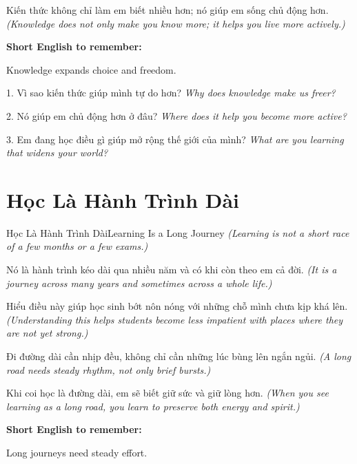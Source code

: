 \begin{baihoc}
Kiến thức không chỉ làm em biết nhiều hơn; nó giúp em sống chủ động hơn.
\textit{(Knowledge does not only make you know more; it helps you live more actively.)}
\end{baihoc}

\begin{ghinhoanh}
\textbf{Short English to remember:}

Knowledge expands choice and freedom.

\end{ghinhoanh}

\begin{tuhocnhanh}
1. Vì sao kiến thức giúp mình tự do hơn? \textit{Why does knowledge make us freer?}

2. Nó giúp em chủ động hơn ở đâu? \textit{Where does it help you become more active?}

3. Em đang học điều gì giúp mở rộng thế giới của mình? \textit{What are you learning that widens your world?}
\end{tuhocnhanh}
\ngancach

\section{Học Là Hành Trình Dài}
\begin{truyen}{Học Là Hành Trình Dài}{Learning Is a Long Journey}
\textit{(Learning is not a short race of a few months or a few exams.)}

Nó là hành trình kéo dài qua nhiều năm và có khi còn theo em cả đời.
\textit{(It is a journey across many years and sometimes across a whole life.)}

Hiểu điều này giúp học sinh bớt nôn nóng với những chỗ mình chưa kịp khá lên.
\textit{(Understanding this helps students become less impatient with places where they are not yet strong.)}

Đi đường dài cần nhịp đều, không chỉ cần những lúc bùng lên ngắn ngủi.
\textit{(A long road needs steady rhythm, not only brief bursts.)}
\end{truyen}

\begin{baihoc}
Khi coi học là đường dài, em sẽ biết giữ sức và giữ lòng hơn.
\textit{(When you see learning as a long road, you learn to preserve both energy and spirit.)}
\end{baihoc}

\begin{ghinhoanh}
\textbf{Short English to remember:}

Long journeys need steady effort.

\end{ghinhoanh}

